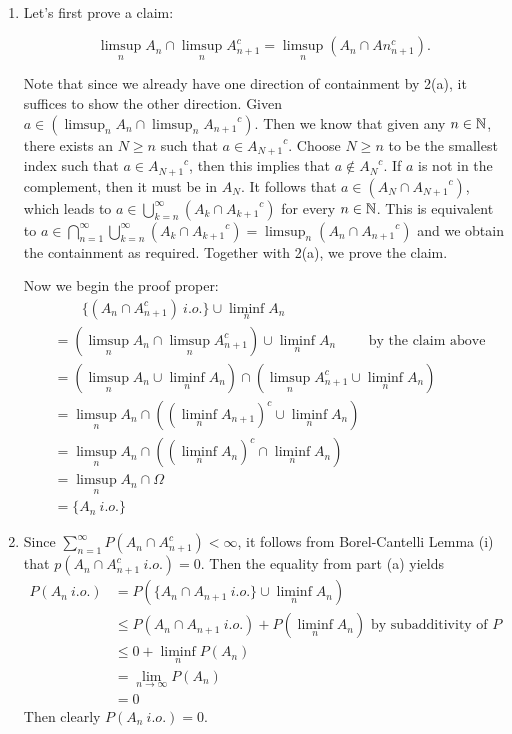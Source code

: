 \documentclass[12pt]{article}
\begin{document}
\begin{problem}[6]
~\begin{enumerate}[label=\alph*)]
	\item Let's first prove a claim:
\begin{claim}[]
\[
	\limsup_{  n} A_n \cap  \limsup_{  n} A_{n+1}^{c} = \limsup_{  n} (A_n \cap An_{n+1}^{c})
.\] 
\end{claim}
Note that since we already have one direction of containment by 2(a), it suffices to show the other direction. Given $ a \in \left( \limsup_{  n} A_n \cap \limsup_{  n} {A_{n+1}}^{c} \right) $. Then we know that given any $ n \in \mathbb{N}$, there exists an $ N \geq n$ such that $ a \in {A_{N+1}}^{c}$. Choose $ N \geq n$ to be the smallest index such that $ a \in {A_{N+1}}^{c}$, then this implies that $ a \not\in {A_N}^{c}$. If $ a$ is not in the complement, then it must be in  $ A_{N}$. It follows that $ a \in (A_N \cap {A_{N+1}}^{c})$, which leads to $ a \in \bigcup_{ k =n}^{\infty} (A_k \cap {A_{k+1}}^{c})$ for every $n \in \mathbb{N}$. This is equivalent to $ a \in \bigcap_{ n= 1}^{\infty} \bigcup_{k= n}^{\infty} (A_k \cap {A_{k+1}}^{c}) = \limsup_{  n} (A_n \cap {A_{n+1}}^{c}) $ and we obtain the containment as required. Together with 2(a), we prove the claim. 

Now we begin the proof proper: 
		\begin{align*}
			& \qquad \{(A_n \cap A_{n+1}^{c})\ i.o.\} \cup \liminf_{  n} A_n \\
									       &= \left( \limsup_{  n} A_n \cap \limsup_{  n} A_{n+1}^{c} \right) \cup \liminf_{  n} A_n \qquad \text{ by the claim above}\\ 
									       &= \left( \limsup_{  n} A_n \cup \liminf_{  n} A_n \right) \cap \left( \limsup_{  n} A_{n+1}^{c} \cup \liminf_{  n} A_n \right) \\
									       &=\limsup_{  n} A_n \cap \left( \left( \liminf_{  n} A_{n+1} \right)^{c} \cup \liminf_{  n} A_n  \right)  \\
									       &= \limsup_{  n} A_n \cap \left( \left( \liminf_{  n} A_n\right)^{c} \cap \liminf_{  n} A_n  \right)   \\
									       &= \limsup_{  n} A_n \cap \Omega \\
									       &= \{A_n\ i.o.\} 
		\end{align*}
	\item Since $ \sum_{ n= 1}^{\infty} P(A_n \cap A_{n+1}^{c}) < \infty$, it follows from Borel-Cantelli Lemma (i) that $ p(A_n \cap A_{n+1}^{c}\ i.o.) =0$. Then the equality from part (a) yields
		\begin{align*}
			P(A_n\ i.o.) &= P( \{A_n \cap A_{n+1} \ i.o.\} \cup  \liminf_{  n} A_n) \\
				     &\leq P(A_n \cap A_{n+1}\ i.o.) + P(\liminf_{  n} A_n) \text{ by subadditivity of }P \\
				     &\leq 0+ \liminf_{  n} P(A_n) \\
				     &= \lim_{ n \to \infty} P(A_n) \\
				     &= 0 
		\end{align*}
		Then clearly $ P(A_n \ i.o.)=0$.
\end{enumerate}
\end{problem}
\end{document}
